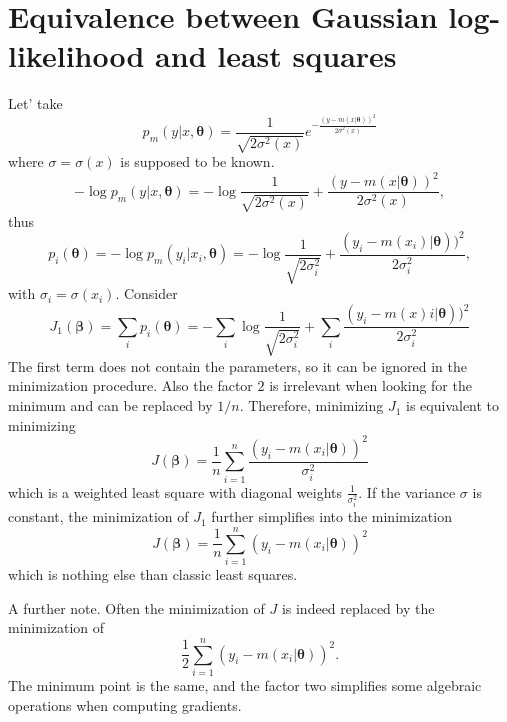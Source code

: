\documentclass{article}
\begin{document}
\section{Equivalence between Gaussian log-likelihood and least squares}
\label{sec:logequivalence}
Let' take 
\[
p_m(y|x,\boldsymbol{\theta})=\frac{1}{\sqrt{2\sigma^2(x)}}e^{-\frac{(y-m(x|\boldsymbol{\theta}))^2}{2\sigma^2(x)}}
\]
where $\sigma=\sigma(x)$ is supposed to be known.
\[
-\log p_m(y|x,\boldsymbol{\theta})=-\log{\frac{1}{\sqrt{2\sigma^2(x)}}}+\frac{(y-m(x|\boldsymbol{\theta}))^2}{2\sigma^2(x)},
\]
thus
\[
p_i(\boldsymbol{\theta})=-\log p_m(y_i|x_i,\boldsymbol{\theta})=-\log{\frac{1}{\sqrt{2\sigma^2_i}}}+\frac{(y_i-m(x_i)|\boldsymbol{\theta}))^2}{2\sigma^2_i},
\]
with $\sigma_i=\sigma(x_i)$. Consider 
\[
J_1(\boldsymbol{\beta})=\sum_i p_i(\boldsymbol{\theta})=-\sum_i \log{\frac{1}{\sqrt{2\sigma^2_i}}} +\sum_i \frac{(y_i-m(x)i|\boldsymbol{\theta}))^2}{2\sigma^2_i}
\]
The first term does not contain the parameters, so it can be ignored in the minimization procedure. Also the factor $2$ is irrelevant when looking for the minimum and can be replaced by $1/n$. Therefore, minimizing $J_1$ is equivalent to minimizing
\[
J(\boldsymbol{\beta})=\frac{1}{n}\sum_{i=1}^n \frac{(y_i-m(x_i|\boldsymbol{\theta}))^2}{\sigma^2_i}
\]
which is a weighted least square with diagonal weights $\frac{1}{\sigma_i^2}$. If the variance $\sigma$ is constant, the minimization of $J_1$ further simplifies into the minimization
\[
J(\boldsymbol{\beta})=\frac{1}{n}\sum_{i=1}^n (y_i-m(x_i|\boldsymbol{\theta}))^2
\]
which is nothing else than classic least squares.

A further note. Often the minimization of $J$ is indeed replaced by the minimization of 
\[
\frac{1}{2}\sum_{i=1}^n (y_i-m(x_i|\boldsymbol{\theta}))^2.
\]
The minimum point is the same, and the factor two simplifies some algebraic operations when computing gradients.
\end{document}
